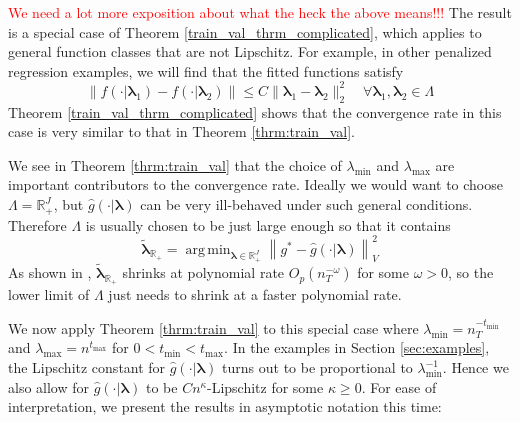 \documentclass[12pt]{article}
\DeclareMathOperator*{\argmin}{arg\,min}
\begin{document}
\textcolor{red}{We need a lot more exposition about what the heck the above means!!!} The result is a special case of Theorem \ref{train_val_thrm_complicated}, which applies to general function classes that are not Lipschitz. For example, in other penalized regression examples, we will find that the fitted functions satisfy
\begin{equation}
\left \| f(\cdot | \boldsymbol \lambda_1) - f(\cdot | \boldsymbol \lambda_2) \right \|
\le
C \| \boldsymbol \lambda_1 - \boldsymbol \lambda_2 \|_2^2
\quad
\forall \boldsymbol \lambda_1,\boldsymbol \lambda_2 \in \Lambda
\label{eq:lipschitz_squared}
\end{equation}
Theorem \ref{train_val_thrm_complicated} shows that the convergence rate in this case is very similar to that in Theorem \ref{thrm:train_val}.

We see in Theorem \ref{thrm:train_val} that the choice of $\lambda_{\min}$ and $\lambda_{\max}$ are important contributors to the convergence rate. Ideally we would want to choose $\Lambda = \mathbb{R}_+^{J}$, but $\hat g(\cdot | \boldsymbol{\lambda})$ can be very ill-behaved under such general conditions. Therefore $\Lambda$ is usually chosen to be just large enough so that it contains
\begin{equation}
\label{eq:true_oracle}
\tilde{\boldsymbol{\lambda}}_{\mathbb{R}_+}
= \argmin_{\boldsymbol{\lambda} \in \mathbb{R}^J_+}\left \| g^* - \hat{g}(\cdot | \boldsymbol \lambda) \right \|^2_V
\end{equation}
As shown in \citet{van2000empirical}, $\tilde{\boldsymbol{\lambda}}_{\mathbb{R}_+}$ shrinks at polynomial rate $O_p(n_T^{-\omega})$ for some $\omega>0$, so the lower limit of $\Lambda$ just needs to shrink at a faster polynomial rate.

We now apply Theorem \ref{thrm:train_val} to this special case where $\lambda_{\min} = n_T^{-t_{\min}}$ and $\lambda_{\max} = n^{t_{\max}}$ for $0 < t_{\min} < t_{\max}$. In the examples in Section \ref{sec:examples}, the Lipschitz constant for $\hat g(\cdot | \boldsymbol{\lambda})$ turns out to be proportional to $\lambda_{\min}^{-1}$. Hence we also allow for $\hat g(\cdot | \boldsymbol{\lambda})$ to be  $Cn^\kappa$-Lipschitz for some $\kappa \ge 0$. For ease of interpretation, we present the results in asymptotic notation this time:
\end{document}
